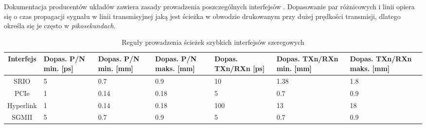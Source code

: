 Dokumentacja producentów układów zawiera zasady prowadzenia poszczególnych interfejsów \cite{DSP_SERDES} \cite{DOCS:HIGH_SPEED_DSP} \cite{DOCS:HIGH_SPEED_LAYOUT}. Dopasowanie par różnicowych i linii opiera się o czas propagacji sygnału w linii transmisyjnej jaką jest ścieżka w obwodzie drukowanym przy dużej prędkości transmisji, dlatego określa się je często w \textit{pikosekundach}. 

\begin{table}[h]
\scriptsize
\centering
	\caption{Reguły prowadzenia ścieżek szybkich interfejsów szeregowych}
    \begin{tabular}{c | p{2cm} |  p{2cm} | p{2cm} | p{2cm} | p{2cm} | p{2cm}}
	\toprule
    \textbf{Interfejs} & \textbf{Dopas. P/N min. [ps]} & \textbf{Dopas. P/N min. [mm]} & \textbf{Dopas. P/N maks. [mm]} & \textbf{Dopas. TXn/RXn [ps]} & \textbf{Dopas. TXn/RXn min. [mm]}  & \textbf{Dopas. TXn/RXn maks. [mm]}\\
    \midrule
    SRIO 	& 	5	&	0.7	&	0.9	&	10	& 	1.38	&	1.8\\
    PCIe 	& 	1	&	0.14	&	0.18	&	5	& 	0.7	&	 0.9\\
    Hyperlink 	& 	1	&	0.14	&	0.18	&	100	& 	13	&	18\\
    SGMII 	& 	5	&	0.7	&	0.9	&	5	& 	0.7	&	 0.9\\
	\toprule
    \end{tabular}

	\label{tbl:serdes_rules}
\end{table}

%
%


